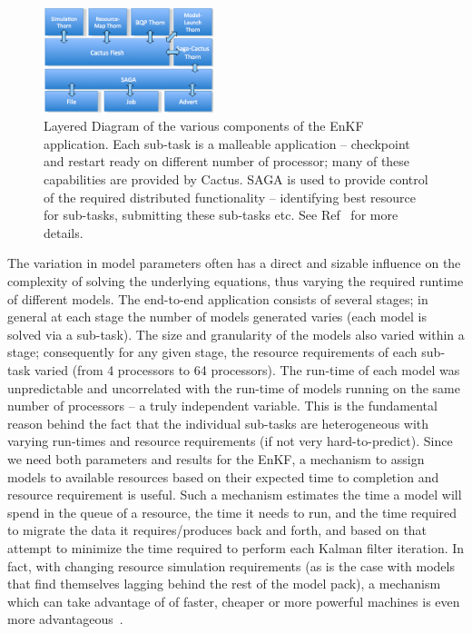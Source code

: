 \documentclass[conference,final]{IEEEtran}
\newcommand{\up}{\vspace*{-1em}}
\begin{document}
\begin{figure}[htbp]
    \centering
    \includegraphics[width=0.44\textwidth]{kalmanfilterlayer.png}
    \caption{Layered Diagram of the various components of the EnKF
      application. Each sub-task is a malleable application --
      checkpoint and restart ready on different number of processor;
      many of these capabilities are provided by Cactus.  SAGA is used
      to provide control of the required distributed functionality --
      identifying best resource for sub-tasks, submitting these
      sub-tasks etc. See Ref~\cite{saga_tg08} for more details.\up\up}
    \label{fig:kalmanfilter}
\end{figure}  

The variation in model parameters often has a direct and sizable
influence on the complexity of solving the underlying equations, thus
varying the required runtime of different models.  The end-to-end
application consists of several stages; in general at each stage the
number of models generated varies (each model is solved via a
sub-task). The size and granularity of the models also varied within a
stage; consequently for any given stage, the resource requirements of
each sub-task varied (from 4 processors to 64 processors). The
run-time of each model was unpredictable and uncorrelated with the
run-time of models running on the same number of processors – a truly
independent variable.  This is the fundamental reason behind the fact
that the individual sub-tasks are heterogeneous with varying run-times
and resource requirements (if not very hard-to-predict).  Since we
need both parameters and results for the EnKF, a mechanism to assign
models to available resources based on their expected time to
completion and resource requirement is useful.  Such a mechanism
estimates the time a model will spend in the queue of a resource, the
time it needs to run, and the time required to migrate the data it
requires/produces back and forth, and based on that attempt to
minimize the time required to perform each Kalman filter iteration.
In fact, with changing resource simulation requirements (as is the
case with models that find themselves lagging behind the rest of the
model pack), a mechanism which can take advantage of of faster,
cheaper or more powerful machines is even more
advantageous~\cite{escience07}.
\end{document}
